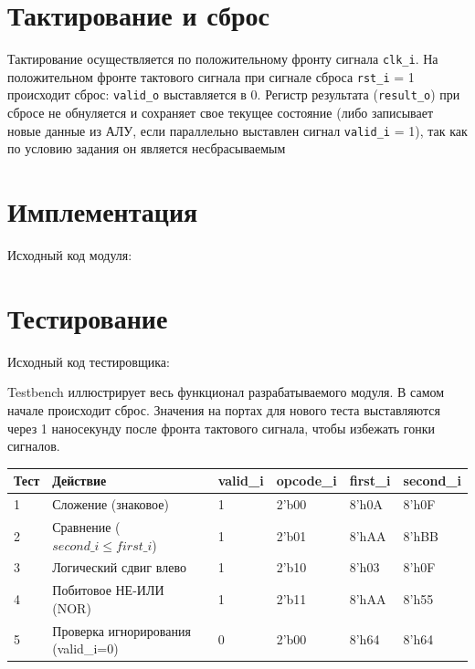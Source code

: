 \section{Тактирование и сброс}
Тактирование осуществляется по положительному фронту сигнала \texttt{clk\_i}. На положительном фронте тактового сигнала при сигнале сброса \texttt{rst\_i} = 1 происходит сброс: \texttt{valid\_o} выставляется в 0. Регистр результата (\texttt{result\_o}) при сбросе не обнуляется и сохраняет свое текущее состояние (либо записывает новые данные из АЛУ, если параллельно выставлен сигнал \texttt{valid\_i} = 1), так как по условию задания он является несбрасываемым

\newpage

\section{Имплементация}
Исходный код модуля: 

\section{Тестирование}
Исходный код тестировщика: 

Testbench иллюстрирует весь функционал разрабатываемого модуля. В самом начале происходит сброс. Значения на портах для нового теста выставляются через 1 наносекунду после фронта тактового сигнала, чтобы избежать гонки сигналов. 

\begin{table}[h!]
    \centering
    \begin{tabular}{|l|l|l|l|l|l|}
        \hline
        \textbf{Тест} & \textbf{Действие} & \textbf{valid\_i} & \textbf{opcode\_i} & \textbf{first\_i} & \textbf{second\_i} \\ \hline
        1 & Сложение (знаковое) & 1 & 2'b00 & 8'h0A & 8'h0F \\ \hline
        2 & Сравнение ($second\_i \le first\_i$) & 1 & 2'b01 & 8'hAA & 8'hBB \\ \hline
        3 & Логический сдвиг влево & 1 & 2'b10 & 8'h03 & 8'h0F \\ \hline
        4 & Побитовое НЕ-ИЛИ (NOR) & 1 & 2'b11 & 8'hAA & 8'h55 \\ \hline
        5 & Проверка игнорирования (valid\_i=0) & 0 & 2'b00 & 8'h64 & 8'h64 \\ \hline
    \end{tabular}
\end{table}


